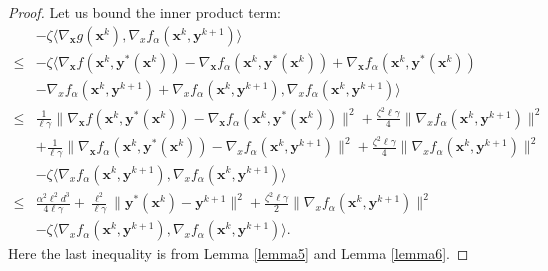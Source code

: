 \begin{proof}
    Let us bound the inner product term:
    \begin{align*}
        & -\zeta\langle \nabla_{ \mathbf{x}} g({ \mathbf{x}}^k),\nabla_xf_\alpha({ \mathbf{x}}^k,{ \mathbf{y}}^{k+1})\rangle \\
        \leq & -\zeta\langle \nabla_{ \mathbf{x}} f({ \mathbf{x}}^k,{ \mathbf{y}}^*({ \mathbf{x}}^k))- \nabla_{ \mathbf{x}} f_\alpha({ \mathbf{x}}^k,{ \mathbf{y}}^*({ \mathbf{x}}^k))+\nabla_{ \mathbf{x}} f_\alpha({ \mathbf{x}}^k,{ \mathbf{y}}^*({ \mathbf{x}}^k)) \\
        & -\nabla_xf_\alpha({ \mathbf{x}}^k,{ \mathbf{y}}^{k+1})+\nabla_xf_\alpha({ \mathbf{x}}^k,{ \mathbf{y}}^{k+1}), \nabla_xf_\alpha({ \mathbf{x}}^k,{ \mathbf{y}}^{k+1})\rangle \\
        \leq & \frac{1}{\ell\gamma}\|\nabla_{ \mathbf{x}} f({ \mathbf{x}}^k,{ \mathbf{y}}^*({ \mathbf{x}}^k))- \nabla_{ \mathbf{x}} f_\alpha({ \mathbf{x}}^k,{ \mathbf{y}}^*({ \mathbf{x}}^k))\|^2+\frac{\zeta^2\ell\gamma}{4}\|\nabla_xf_\alpha({ \mathbf{x}}^k,{ \mathbf{y}}^{k+1})\|^2 \\
        & + \frac{1}{\ell\gamma}\|\nabla_{ \mathbf{x}} f_\alpha({ \mathbf{x}}^k,{ \mathbf{y}}^*({ \mathbf{x}}^k))- \nabla_xf_\alpha({ \mathbf{x}}^k,{ \mathbf{y}}^{k+1})\|^2+\frac{\zeta^2\ell\gamma}{4}\|\nabla_xf_\alpha({ \mathbf{x}}^k,{ \mathbf{y}}^{k+1})\|^2 \\
        & -\zeta\langle \nabla_xf_\alpha({ \mathbf{x}}^k,{ \mathbf{y}}^{k+1}), \nabla_xf_\alpha({ \mathbf{x}}^k,{ \mathbf{y}}^{k+1})\rangle \\
        \leq & \frac{\alpha^2 \ell^2 d^3}{4\ell\gamma}+\frac{\ell^2}{\ell\gamma}\|{ \mathbf{y}}^*({ \mathbf{x}}^k)-{ \mathbf{y}}^{k+1}\|^2+\frac{\zeta^2\ell\gamma}{2}\|\nabla_xf_\alpha({ \mathbf{x}}^k,{ \mathbf{y}}^{k+1})\|^2 \\
        & -\zeta\langle \nabla_xf_\alpha({ \mathbf{x}}^k,{ \mathbf{y}}^{k+1}), \nabla_xf_\alpha({ \mathbf{x}}^k,{ \mathbf{y}}^{k+1})\rangle.
    \end{align*}
    Here the last inequality is from Lemma \ref{lemma5} and Lemma \ref{lemma6}.


\end{proof}
